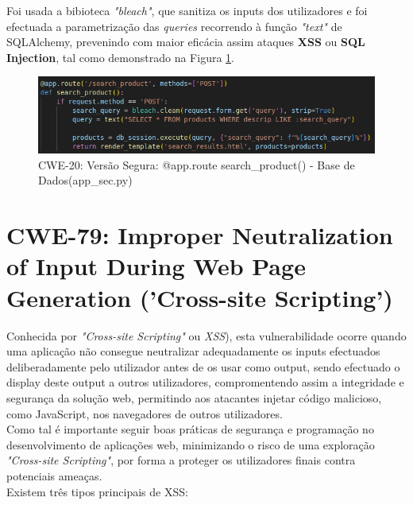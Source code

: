 Foi usada a bibioteca \textit{"bleach"}, que sanitiza os inputs dos utilizadores e foi efectuada a parametrização das \textit{queries} recorrendo à função \textit{"text"} de SQLAlchemy, prevenindo com maior eficácia assim ataques \textbf{XSS} ou \textbf{SQL Injection}, tal como demonstrado na Figura \ref{fig:cwe20-cod1s}.\\

\begin{figure}[H]
  \centering
  \includegraphics[width=16cm]{images/CWE-20-cod1s.png}
  \caption{CWE-20: Versão Segura: @app.route search\_product() - Base de Dados(app\_sec.py)}
  \label{fig:cwe20-cod1s}
\end{figure}
%
%
\section{CWE-79: Improper Neutralization of Input During Web Page Generation ('Cross-site Scripting')}
\label{sec.cwe79}

Conhecida por \textit{"Cross-site Scripting"} ou \textit{XSS}), esta vulnerabilidade ocorre quando uma aplicação não consegue neutralizar adequadamente os inputs efectuados deliberadamente pelo utilizador antes de os usar como output, sendo efectuado o display deste output a outros utilizadores, compromentendo assim a integridade e segurança da solução web, permitindo aos atacantes injetar código malicioso, como JavaScript, nos navegadores de outros utilizadores. \\
Como tal é importante seguir boas práticas de segurança e programação no desenvolvimento de aplicações web, minimizando o risco de uma exploração \textit{"Cross-site Scripting"}, por forma a proteger os utilizadores finais contra potenciais ameaças. \\
Existem três tipos principais de XSS:


